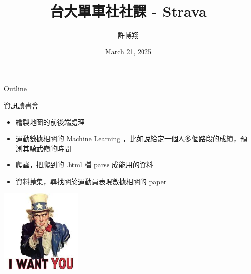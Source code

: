 \title{台大單車社社課 - Strava}
\author{許博翔}
\institute{}
\date{March 21, 2025}


\frame{\titlepage}
\begin{frame}{Outline}
\tableofcontents
\end{frame}








\begin{frame}{資訊讀書會}
\begin{itemize}
\item 繪製地圖的前後端處理\pause
\item 運動數據相關的 Machine Learning ，比如說給定一個人多個路段的成績，預測其騎武嶺的時間\pause
\item 爬蟲，把爬到的 .html 檔 parse 成能用的資料\pause
\item 資料蒐集，尋找關於運動員表現數據相關的 paper\pause
\end{itemize}
\begin{center}
\includegraphics[width=4cm]{IWantYou.jpeg}
\end{center}
\end{frame}


